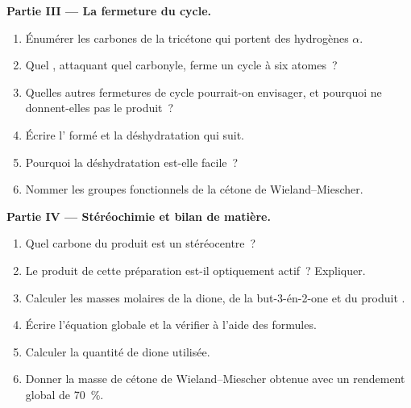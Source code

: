 \begin{problem}
\medskip
\noindent\textbf{Partie III --- La fermeture du cycle.}
\begin{enumerate}[resume]
  \item Énumérer les carbones de la tricétone qui portent des hydrogènes $\alpha$.
  \item Quel , attaquant quel carbonyle, ferme un cycle à six atomes~?
  \item Quelles autres fermetures de cycle pourrait-on envisager, et pourquoi ne donnent-elles pas le produit~?
  \item Écrire l' formé et la déshydratation qui suit.
  \item Pourquoi la déshydratation est-elle facile~?
  \item Nommer les groupes fonctionnels de la cétone de Wieland--Miescher.
\end{enumerate}

\medskip
\noindent\textbf{Partie IV --- Stéréochimie et bilan de matière.}
\begin{enumerate}[resume]
  \item Quel carbone du produit est un stéréocentre~?
  \item Le produit de cette préparation est-il optiquement actif~? Expliquer.
  \item Calculer les masses molaires de la dione, de la but-3-én-2-one et du produit
        .
  \item Écrire l'équation globale et la vérifier à l'aide des formules.
  \item Calculer la quantité de dione utilisée.
  \item Donner la masse de cétone de Wieland--Miescher obtenue avec un rendement global de 70~\%.
\end{enumerate}
\end{problem}
